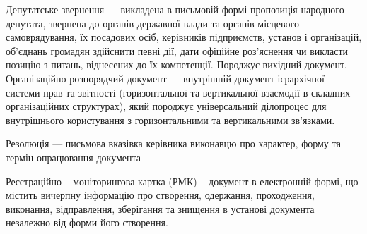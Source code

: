 Депутатське звернення — викладена в письмовій формі пропозиція народного
депутата, звернена до органів державної влади та органів місцевого
самоврядування, їх посадових осіб, керівників підприємств, установ і організацій,
об'єднань громадян здійснити певні дії, дати офіційне роз'яснення чи викласти
позицію з питань, віднесених до їх компетенції. Породжує вихідний документ.
Організаційно-розпорядчий документ — внутрішній документ ієрархічної
системи прав та звітності (горизонтальної та вертикальної взаємодії в складних
організаційних структурах), який породжує універсальний ділопроцес для
внутрішнього користування з горизонтальними та вертикальними зв’язками.

Резолюція — письмова вказівка керівника виконавцю про характер, форму та
термін опрацювання документа

Реєстраційно – моніторингова картка (РМК) – документ в електронній формі,
що містить вичерпну інформацію про створення, одержання, проходження,
виконання, відправлення, зберігання та знищення в установі документа незалежно
від форми його створення.